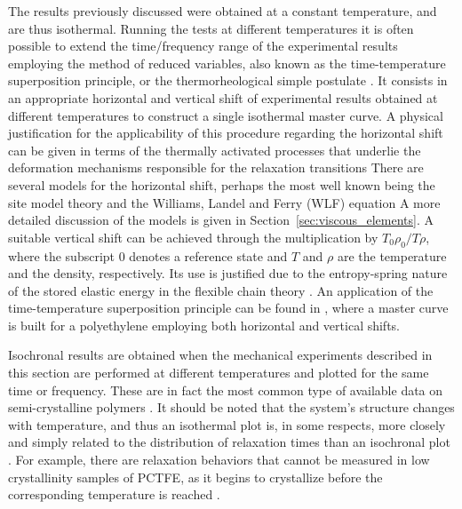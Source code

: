 The results previously discussed were obtained at a constant temperature, and are thus isothermal.
Running the tests at different temperatures it is often possible to extend the time/frequency range of the experimental results employing the method of reduced variables, also known as the time-temperature superposition principle, or the thermorheological simple postulate \citep{ferryViscoelasticPropertiesPolymers1980, christensen2013theory}.
It consists in an appropriate horizontal and vertical shift of experimental results obtained at different temperatures to construct a single isothermal master curve.
A physical justification for the applicability of this procedure regarding the horizontal shift can be given in terms of the thermally activated processes that underlie the deformation mechanisms responsible for the relaxation transitions \citep{arzhakovRelaxationPhysicalMechanical2019}
There are several models for the horizontal shift, perhaps the most well known being the site model theory and the Williams, Landel and Ferry (WLF) equation \citep{wardIntroductionMechanicalProperties2004, furmanskiTimeTemperatureEquivalence2013}
A more detailed discussion of the models is given in Section~\ref{sec:viscous_elements}.
A suitable vertical shift can be achieved through the multiplication by $T_0\rho_0/T\rho$, where the subscript 0 denotes a reference state and $T$ and $\rho$ are the temperature and the density, respectively.
Its use is justified due to the entropy-spring nature of the stored elastic energy in the flexible chain theory \citep{ferryViscoelasticPropertiesPolymers1980}.
An application of the time-temperature superposition principle can be found in \cite{popelarViscoelasticMaterialCharacterization1990}, where a master curve is built for a polyethylene employing both horizontal and vertical shifts.

Isochronal results are obtained when the mechanical experiments described in this section are performed at different temperatures and plotted for the same time or frequency.
These are in fact the most common type of available data on semi-crystalline polymers \citep{ferryViscoelasticPropertiesPolymers1980}.
It should be noted that the system's structure changes with temperature, and thus an isothermal plot is, in some respects, more closely and simply related to the distribution of relaxation times than an isochronal plot \citep{hoffmanAnalysisRelaxationsPolychlorotrifluoroethylene2007}.
For example, there are relaxation behaviors that cannot be measured in low crystallinity samples of PCTFE, as it begins to crystallize before the corresponding temperature is reached \citep{hoffmanAnalysisRelaxationsPolychlorotrifluoroethylene2007}.

